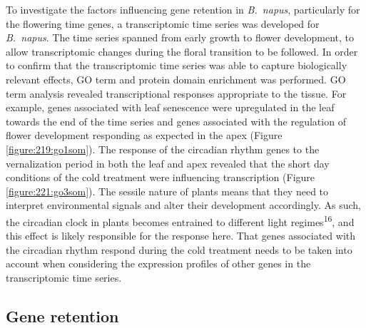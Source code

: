 \documentclass[12pt,]{book}
\begin{document}
To investigate the factors influencing gene retention in
\emph{B.~napus}, particularly for the flowering time genes, a
transcriptomic time series was developed for \emph{B.~napus}. The time
series spanned from early growth to flower development, to allow
transcriptomic changes during the floral transition to be followed. In
order to confirm that the transcriptomic time series was able to capture
biologically relevant effects, GO term and protein domain enrichment was
performed. GO term analysis revealed transcriptional responses
appropriate to the tissue. For example, genes associated with leaf
senescence were upregulated in the leaf towards the end of the time
series and genes associated with the regulation of flower development
responding as expected in the apex (Figure \ref{figure:219:go1som}). The
response of the circadian rhythm genes to the vernalization period in
both the leaf and apex revealed that the short day conditions of the
cold treatment were influencing transcription (Figure
\ref{figure:221:go3som}). The sessile nature of plants means that they
need to interpret environmental signals and alter their development
accordingly. As such, the circadian clock in plants becomes entrained to
different light regimes\textsuperscript{16}, and this effect is likely
responsible for the response here. That genes associated with the
circadian rhythm respond during the cold treatment needs to be taken
into account when considering the expression profiles of other genes in
the transcriptomic time series.

\subsection{Gene retention}\label{gene-retention}
\end{document}

